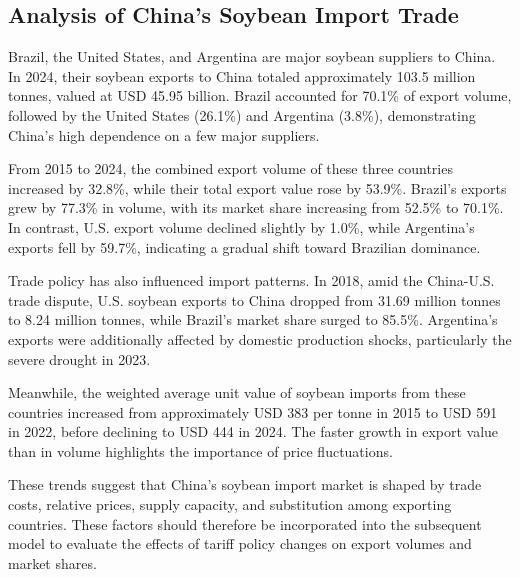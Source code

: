 \subsection{Analysis of China's Soybean Import Trade}

Brazil, the United States, and Argentina are major soybean suppliers to China. In 2024, their soybean exports to China totaled approximately 103.5 million tonnes, valued at USD 45.95 billion. Brazil accounted for 70.1\% of export volume, followed by the United States (26.1\%) and Argentina (3.8\%), demonstrating China's high dependence on a few major suppliers.

From 2015 to 2024, the combined export volume of these three countries increased by 32.8\%, while their total export value rose by 53.9\%. Brazil's exports grew by 77.3\% in volume, with its market share increasing from 52.5\% to 70.1\%. In contrast, U.S. export volume declined slightly by 1.0\%, while Argentina's exports fell by 59.7\%, indicating a gradual shift toward Brazilian dominance.

Trade policy has also influenced import patterns. In 2018, amid the China-U.S. trade dispute, U.S. soybean exports to China dropped from 31.69 million tonnes to 8.24 million tonnes, while Brazil's market share surged to 85.5\%. Argentina's exports were additionally affected by domestic production shocks, particularly the severe drought in 2023.

Meanwhile, the weighted average unit value of soybean imports from these countries increased from approximately USD 383 per tonne in 2015 to USD 591 in 2022, before declining to USD 444 in 2024. The faster growth in export value than in volume highlights the importance of price fluctuations.

These trends suggest that China's soybean import market is shaped by trade costs, relative prices, supply capacity, and substitution among exporting countries. These factors should therefore be incorporated into the subsequent model to evaluate the effects of tariff policy changes on export volumes and market shares.